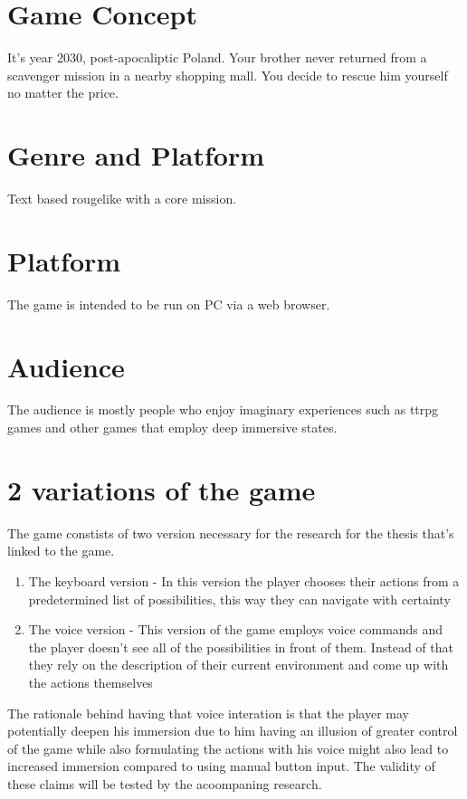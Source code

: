 

\section{Game Concept}


It's year 2030, post-apocaliptic Poland. Your brother never returned from a scavenger mission in a nearby shopping mall.
You decide to rescue him yourself no matter the price.

\section{Genre and Platform}
Text based rougelike with a core mission.

\section{Platform}
The game is intended to be run on PC via a web browser.


\section{Audience}

The audience is mostly people who enjoy imaginary experiences such as ttrpg games
and other games that employ deep immersive states.

\section{2 variations of the game}

The game constists of two version necessary for the research for the thesis that's linked to the game.

\begin{enumerate}
    \item The keyboard version - In this version the player chooses their actions from a predetermined
    list of possibilities, this way they can navigate with certainty 
    \item The voice version - This version of the game employs voice commands and the player doesn't see 
    all of the possibilities in front of them. Instead of that they rely on the description of their current 
    environment and come up with the actions themselves
\end{enumerate}

The rationale behind having that voice interation is that the player may potentially deepen his immersion
due to him having an illusion of greater control of the game while also formulating the actions with his voice
might also lead to increased immersion compared to using manual button input. The validity of these claims
will be tested by the acoompaning research.